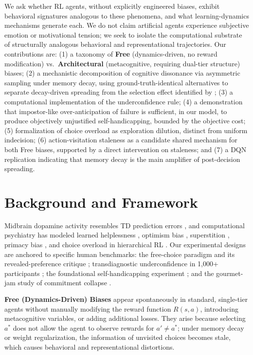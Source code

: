 \documentclass[conference]{IEEEtran}
\begin{document}
We ask whether RL agents, without explicitly engineered biases, exhibit behavioral signatures analogous to these phenomena, and what learning-dynamics mechanisms generate each. We do not claim artificial agents experience subjective emotion or motivational tension; we seek to isolate the computational substrate of structurally analogous behavioral and representational trajectories. Our contributions are: (1) a taxonomy of \textbf{Free} (dynamics-driven, no reward modification) vs.\ \textbf{Architectural} (metacognitive, requiring dual-tier structure) biases; (2) a mechanistic decomposition of cognitive dissonance via asymmetric sampling under memory decay, using ground-truth-identical alternatives to separate decay-driven spreading from the selection effect identified by \citet{chen2010choice}; (3) a computational implementation of the \citet{katyal2025distorted} underconfidence rule; (4) a demonstration that impostor-like over-anticipation of failure is sufficient, in our model, to produce objectively unjustified self-handicapping, bounded by the objective cost; (5) formalization of choice overload as exploration dilution, distinct from uniform indecision; (6) action-visitation staleness as a candidate shared mechanism for both Free biases, supported by a direct intervention on staleness; and (7) a DQN replication indicating that memory decay is the main amplifier of post-decision spreading.

\section{Background and Framework}

Midbrain dopamine activity resembles TD prediction errors \citep{schultz1997neural}, and computational psychiatry has modeled learned helplessness \citep{huys2009bayesian}, optimism bias \citep{lefebvre2017behavioural}, superstition \citep{bontrager2019superstition}, primacy bias \citep{nikishin2022primacy}, and choice overload in hierarchical RL \citep{nica2022paradox,dubey2022pursuit}. Our experimental designs are anchored to specific human benchmarks: the free-choice paradigm \citep{brehm1956postdecision} and its revealed-preference critique \citep{chen2010choice}; transdiagnostic underconfidence in 1{,}000+ participants \citep{katyal2025distorted}; the foundational self-handicapping experiment \citep{berglas1978drug}; and the gourmet-jam study of commitment collapse \citep{iyengar2000choice}.

\textbf{Free (Dynamics-Driven) Biases} appear spontaneously in standard, single-tier agents without manually modifying the reward function $R(s,a)$, introducing metacognitive variables, or adding additional losses. They arise because selecting $a^*$ does not allow the agent to observe rewards for $a'\neq a^*$; under memory decay or weight regularization, the information of unvisited choices becomes stale, which causes behavioral and representational distortions.
\end{document}
